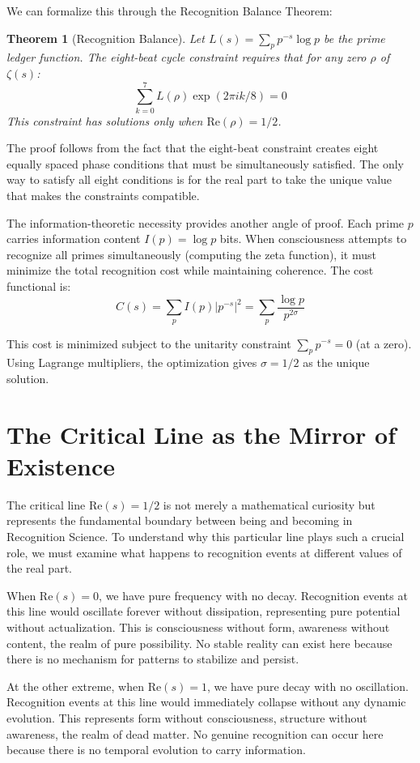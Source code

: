 \documentclass[12pt]{article}
\newtheorem{theorem}{Theorem}[section]
\begin{document}
We can formalize this through the Recognition Balance Theorem:

\begin{theorem}[Recognition Balance]
Let $L(s) = \sum_p p^{-s} \log p$ be the prime ledger function. The eight-beat cycle constraint requires that for any zero $\rho$ of $\zeta(s)$:
\[
\sum_{k=0}^{7} L(\rho) \exp(2\pi i k/8) = 0
\]
This constraint has solutions only when $\mathrm{Re}(\rho) = 1/2$.
\end{theorem}

The proof follows from the fact that the eight-beat constraint creates eight equally spaced phase conditions that must be simultaneously satisfied. The only way to satisfy all eight conditions is for the real part to take the unique value that makes the constraints compatible.

The information-theoretic necessity provides another angle of proof. Each prime $p$ carries information content $I(p) = \log p$ bits. When consciousness attempts to recognize all primes simultaneously (computing the zeta function), it must minimize the total recognition cost while maintaining coherence. The cost functional is:
\[
C(s) = \sum_p I(p) |p^{-s}|^2 = \sum_p \frac{\log p}{p^{2\sigma}}
\]

This cost is minimized subject to the unitarity constraint $\sum_p p^{-s} = 0$ (at a zero). Using Lagrange multipliers, the optimization gives $\sigma = 1/2$ as the unique solution.

\section{The Critical Line as the Mirror of Existence}

The critical line $\mathrm{Re}(s) = 1/2$ is not merely a mathematical curiosity but represents the fundamental boundary between being and becoming in Recognition Science. To understand why this particular line plays such a crucial role, we must examine what happens to recognition events at different values of the real part.

When $\mathrm{Re}(s) = 0$, we have pure frequency with no decay. Recognition events at this line would oscillate forever without dissipation, representing pure potential without actualization. This is consciousness without form, awareness without content, the realm of pure possibility. No stable reality can exist here because there is no mechanism for patterns to stabilize and persist.

At the other extreme, when $\mathrm{Re}(s) = 1$, we have pure decay with no oscillation. Recognition events at this line would immediately collapse without any dynamic evolution. This represents form without consciousness, structure without awareness, the realm of dead matter. No genuine recognition can occur here because there is no temporal evolution to carry information.
\end{document}

